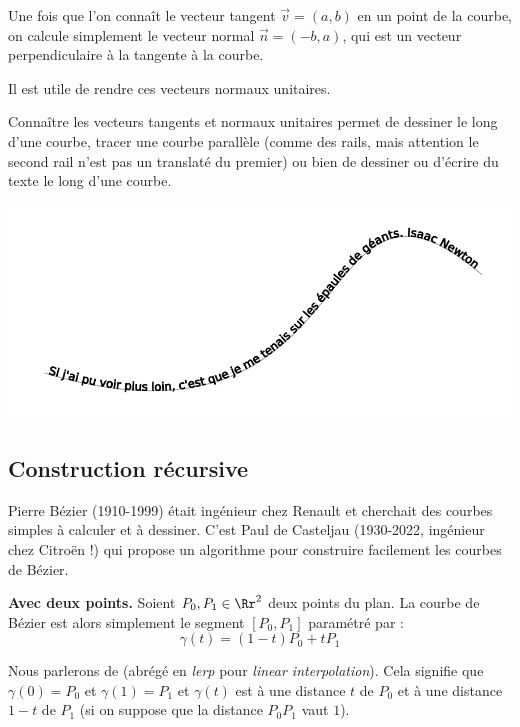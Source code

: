 \documentclass[11pt,class=report,crop=false]{standalone}
\begin{document}


Une fois que l'on connaît le vecteur tangent $\vec v = (a,b)$ en un point de la courbe, on calcule simplement le vecteur 
normal $\vec n = (-b,a)$, qui est un vecteur perpendiculaire à la tangente à la courbe.

Il est utile de rendre ces vecteurs normaux unitaires.

Connaître les vecteurs tangents et normaux unitaires permet de dessiner le long d'une courbe, 
tracer une courbe parallèle (comme des rails, mais attention le second rail n'est pas un translaté du premier) ou bien de dessiner ou d'écrire du texte le long d'une courbe.

\begin{center}
  \includegraphics[scale=\myscale,scale=0.4]{figures/texte-bezier}
\end{center}



\subsection{Construction récursive}

Pierre Bézier (1910-1999) était ingénieur chez Renault et cherchait des courbes simples à calculer et à dessiner.
C'est Paul de Casteljau (1930-2022, ingénieur chez Citroën !) qui propose un algorithme pour construire facilement les courbes de Bézier.

\textbf{Avec deux points.}
Soient $P_0,P_1 \in \Rr^2$ deux points du plan.
La courbe de Bézier est alors simplement le segment $[P_0,P_1]$ paramétré par :
$$\gamma(t) = (1-t)P_0 + tP_1$$



Nous parlerons de  (abrégé en \emph{lerp} pour \emph{linear interpolation}).
Cela signifie que $\gamma(0) = P_0$ et $\gamma(1) = P_1$ et $\gamma(t)$ est à une distance $t$ de $P_0$ et à une distance $1-t$ de $P_1$ 
(si on suppose que la distance $P_0P_1$ vaut $1$).
\end{document}

